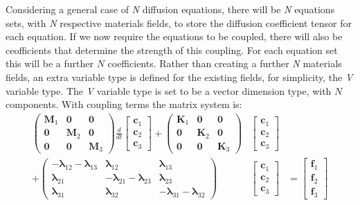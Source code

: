 Considering a general case of \textit{N} diffusion equations, there will be \textit{N} equations sets, with \textit{N} respective materials fields, to store the diffusion coefficient tensor for each equation. If we now require the equations to be coupled, there will also be ceofficients that determine the strength of this coupling. For each equation set this will be a further $N$ coefficients. Rather than creating a further \textit{N} materials fields, an extra variable type is defined for the existing fields, for simplicity, the \textit{V} variable type. The \textit{V} variable type is set to be a vector dimension type, with $N$ components. With coupling terms the matrix system is:
\begin{eqnarray}
\label{M_matrix}
\displaystyle \left( \begin{array}{ccc}
\mathbf{M}_1   & {\boldsymbol{0}} & {\boldsymbol{0}} \\
{\boldsymbol{0}} & \mathbf{M}_2 & {\boldsymbol{0}} \\
{\boldsymbol{0}} & {\boldsymbol{0}} & \mathbf{M}_3
\end{array} \right)  
\frac{d}{dt}
\left[ \begin{array}{c}
\mathbf{c}_1\\
\mathbf{c}_2\\
\mathbf{c}_3
\end{array} \right]
+
\displaystyle \left( \begin{array}{ccc}
\mathbf{K}_1   & {\boldsymbol{0}} & {\boldsymbol{0}} \\
{\boldsymbol{0}} & \mathbf{K}_2 & {\boldsymbol{0}} \\
{\boldsymbol{0}} & {\boldsymbol{0}} & \mathbf{K}_3
\end{array} \right)  
&\left[ \begin{array}{c}
\mathbf{c}_1\\
\mathbf{c}_2\\
\mathbf{c}_3
\end{array} \right] &\\
+
\left( \begin{array}{ccc}
-\boldsymbol{\lambda}_{12}-\boldsymbol{\lambda}_{13} & \boldsymbol{\lambda}_{12} & \boldsymbol{\lambda}_{13}  \\
\boldsymbol{\lambda}_{21} & -\boldsymbol{\lambda}_{21}-\boldsymbol{\lambda}_{23} & \boldsymbol{\lambda}_{23} \\
\boldsymbol{\lambda}_{31} & \boldsymbol{\lambda}_{32} & -\boldsymbol{\lambda}_{31}-\boldsymbol{\lambda}_{32}
\end{array} \right)
& \left[ \begin{array}{c}
\mathbf{c}_1\\
\mathbf{c}_2\\
\mathbf{c}_3
\end{array} \right] &
=
\left[ \begin{array}{c}
\mathbf{f}_1\\
\mathbf{f}_2\\
\mathbf{f}_3
\end{array} \right]
\end{eqnarray}

